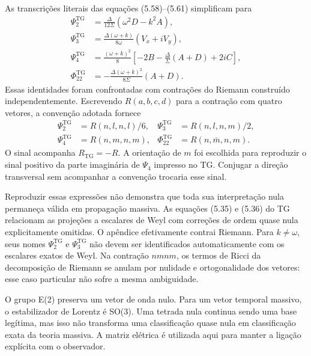 As transcrições literais das equações (5.58)--(5.61) simplificam para
\begin{equation}
 \begin{aligned}
 \Psi_2^{\mathrm{TG}}&=
    \frac{\Delta}{12\Sigma}(\omega^2D-k^2A),\\
 \Psi_3^{\mathrm{TG}}&=
    \frac{\Delta(\omega+k)}{8\omega}(V_x+iV_y),\\
 \Psi_4^{\mathrm{TG}}&=
    \frac{(\omega+k)^2}{8}
        \left[-2B-\frac{\Delta}{\Sigma}(A+D)+2iC\right],\\
 \Phi_{22}^{\mathrm{TG}}&=
    -\frac{\Delta(\omega+k)^2}{8\Sigma}(A+D).
 \end{aligned}
 \label{eq:fund-tg-projecoes}
\end{equation}
Essas identidades foram confrontadas com contrações do Riemann
construído independentemente. Escrevendo \(R(a,b,c,d)\) para a
contração com quatro vetores, a convenção adotada fornece
\begin{equation}
 \begin{aligned}
 \Psi_2^{\mathrm{TG}}&=R(n,l,n,l)/6,
 &\Psi_3^{\mathrm{TG}}&=R(n,l,n,m)/2,\\
 \Psi_4^{\mathrm{TG}}&=R(n,m,n,m),
 &\Phi_{22}^{\mathrm{TG}}&=R(n,\bar m,n,m).
 \end{aligned}
 \label{eq:fund-tg-contracoes}
\end{equation}
O sinal acompanha \(R_{\mathrm{TG}}=-R\). A orientação de \(m\)
foi escolhida para reproduzir o sinal positivo da parte imaginária de
\(\Psi_4\) impresso no TG. Conjugar a direção transversal sem
acompanhar a convenção trocaria esse sinal.

Reproduzir essas expressões não demonstra que toda sua interpretação
nula permaneça válida em propagação massiva. As equações (5.35) e
(5.36) do TG relacionam as projeções a escalares de Weyl com correções
de ordem quase nula explicitamente omitidas. O apêndice efetivamente
contrai Riemann. Para \(k\ne\omega\), seus nomes
\(\Psi_2^{\mathrm{TG}}\) e \(\Psi_3^{\mathrm{TG}}\) não devem
ser identificados automaticamente com os escalares exatos de Weyl.
Na contração \(nmnm\), os termos de Ricci da decomposição de Riemann
se anulam por nulidade e ortogonalidade dos vetores: esse caso
particular não sofre a mesma ambiguidade.

O grupo E(2) preserva um vetor de onda nulo. Para um vetor temporal
massivo, o estabilizador de Lorentz é SO(3). Uma tetrada nula continua
sendo uma base legítima, mas isso não transforma uma classificação
quase nula em classificação exata da teoria massiva. A matriz elétrica
é utilizada aqui para manter a ligação explícita com o observador.

